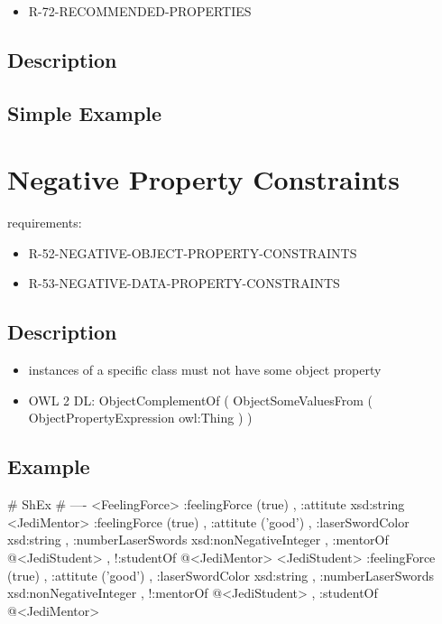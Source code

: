 \documentclass{llncs}
\begin{document}
\begin{itemize}
	\item R-72-RECOMMENDED-PROPERTIES
\end{itemize}

\subsection{Description}

\subsection{Simple Example}

\section{Negative Property Constraints}

requirements:

\begin{itemize}
	\item R-52-NEGATIVE-OBJECT-PROPERTY-CONSTRAINTS
	\item R-53-NEGATIVE-DATA-PROPERTY-CONSTRAINTS
\end{itemize}

\subsection{Description}

\begin{itemize}
	\item instances of a specific class must not have some object property
  \item OWL 2 DL: ObjectComplementOf ( ObjectSomeValuesFrom ( ObjectPropertyExpression owl:Thing ) )
\end{itemize}

\subsection{Example}

\begin{ex}
# ShEx
# ----
<FeelingForce> {
    :feelingForce (true) ,
    :attitute xsd:string }
<JediMentor> {
    :feelingForce (true) ,
    :attitute ('good') ,
    :laserSwordColor xsd:string ,
    :numberLaserSwords xsd:nonNegativeInteger ,
    :mentorOf @<JediStudent> ,
   !:studentOf @<JediMentor> }
<JediStudent> {
    :feelingForce (true) ,
    :attitute ('good') ,
    :laserSwordColor xsd:string ,
    :numberLaserSwords xsd:nonNegativeInteger ,
   !:mentorOf @<JediStudent> ,
    :studentOf @<JediMentor> }
\end{ex}
\end{document}

